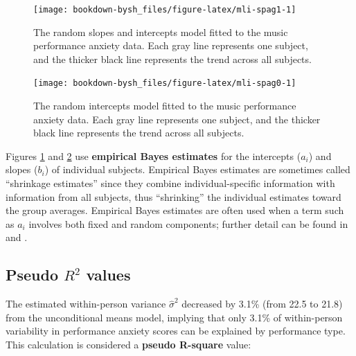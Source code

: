 \documentclass[
]{krantz}
\begin{document}
\begin{figure}

{\centering \texttt{[image: bookdown-bysh\_files/figure-latex/mli-spag1-1]} 

}

\caption{The random slopes and intercepts model fitted to the music performance anxiety data.  Each gray line represents one subject, and the thicker black line represents the trend across all subjects.}\label{fig:mli-spag1}
\end{figure}

\begin{figure}

{\centering \texttt{[image: bookdown-bysh\_files/figure-latex/mli-spag0-1]} 

}

\caption{The random intercepts model fitted to the music performance anxiety data.  Each gray line represents one subject, and the thicker black line represents the trend across all subjects.}\label{fig:mli-spag0}
\end{figure}

Figures \ref{fig:mli-spag1} and \ref{fig:mli-spag0} use \textbf{empirical Bayes estimates}  for the intercepts (\(a_{i}\)) and slopes (\(b_{i}\)) of individual subjects. Empirical Bayes estimates are sometimes called ``shrinkage estimates'' since they combine individual-specific information with information from all subjects, thus ``shrinking'' the individual estimates toward the group averages. Empirical Bayes estimates are often used when a term such as \(a_{i}\) involves both fixed and random components; further detail can be found in \citet{Bryk2002} and \citet{Singer2003}.

\hypertarget{pseudoR2}{%
\subsection{\texorpdfstring{Pseudo \(R^2\) values}{Pseudo R\^{}2 values}}\label{pseudoR2}}

The estimated within-person variance \(\hat{\sigma}^2\) decreased by 3.1\% (from 22.5 to 21.8) from the unconditional means model, implying that only 3.1\% of within-person variability in performance anxiety scores can be explained by performance type. This calculation is considered a \textbf{pseudo R-square}  value:
\end{document}
